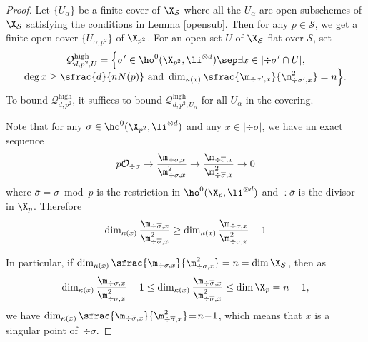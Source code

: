 \begin{proof}[Proof]
Let $\{U_{\alpha}\}$ be a finite cover of $\X_{\mathcal{S}}$ where all the $U_{\alpha}$ are open subschemes of $\X_{\mathcal{S}}$ satisfying the conditions in Lemma \ref{opensub}. Then for any $p\in \mathcal{S}$, we get a finite open cover $\{U_{\alpha,p^2}\}$ of $\X_{p^2}$. For an open set $U$ of $\X_{\mathcal{S}}$ flat over $\mathcal{S}$, set
\begin{multline*}
\mathcal{Q}^{\mathrm{high}}_{d,p^2,U}=\Bigl\{ \sigma'\in \ho^0(\X_{p^2}, \li^{\otimes d})\sep \exists x\in |{\div \sigma'\cap U}|,\\[-5pt]\deg x\geq \sfrac{d}{nN(p)} \text{ and } \dim_{\kappa(x)}\sfrac{\m_{\div \sigma',x}}{\m^2_{\div \sigma', x}}=n \Bigr\}.
\end{multline*}
To bound $\mathcal{Q}^{\mathrm{high}}_{d,p^2}$, it suffices to bound $\mathcal{Q}^{\mathrm{high}}_{d,p^2,U_{\alpha}}$ for all $U_{\alpha}$ in the covering.

Note that for any $\sigma\in \ho^0(\X_{p^2}, \li^{\otimes d})$ and any $x\in |{\div\sigma}|$, we have an exact sequence
\[
p\mathcal{O_{\div \sigma}} \to \frac{\m_{\div \sigma,x}}{\m^2_{\div \sigma, x}} \to \frac{\m_{\div \overline{\sigma},x}}{\m^2_{\div \overline{\sigma}, x}} \to 0
\]
where $\overline{\sigma}=\sigma\bmod p$ is the restriction in $\ho^0(\X_{p}, \li^{\otimes d})$ and $\div \overline{\sigma}$ is the divisor in $\X_p$. Therefore
\[
\dim_{\kappa(x)}\frac{\m_{\div \overline{\sigma},x}}{\m^2_{\div \overline{\sigma}, x}} \geq \dim_{\kappa(x)}\frac{\m_{\div \sigma,x}}{\m^2_{\div \sigma, x}}-1
\]

In particular, if $\dim_{\kappa(x)}\sfrac{\m_{\div \sigma,x}}{\m^2_{\div \sigma, x}}=n=\dim \X_{\mathcal{S}}$, then as
\[
\dim_{\kappa(x)}\frac{\m_{\div \sigma,x}}{\m^2_{\div \sigma, x}}-1\leq \dim_{\kappa(x)}\frac{\m_{\div \overline{\sigma},x}}{\m^2_{\div \overline{\sigma}, x}} \leq \dim \X_p=n-1,
\]
we have $ \dim_{\kappa(x)}\sfrac{\m_{\div \overline{\sigma},x}}{\m^2_{\div \overline{\sigma}, x}}\!=\!n\!-\!1$, which means that $x$ is a singular point of~$\div \overline{\sigma}$.


\end{proof}
